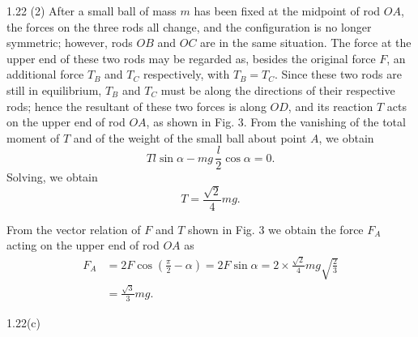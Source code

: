 \begin{solution}{1.22}
(2) After a small ball of mass $m$ has been fixed at the midpoint of rod $OA$, the forces on the three rods all change, and the configuration is no longer symmetric; however, rods $OB$ and $OC$ are in the same situation. The force at the upper end of these two rods may be regarded as, besides the original force $F$, an additional force $T_B$ and $T_C$ respectively, with $T_B=T_C$. Since these two rods are still in equilibrium, $T_B$ and $T_C$ must be along the directions of their respective rods; hence the resultant of these two forces is along $OD$, and its reaction $T$ acts on the upper end of rod $OA$, as shown in Fig. 3. From the vanishing of the total moment of $T$ and of the weight of the small ball about point $A$, we obtain
\[
Tl\sin\alpha-mg\,\frac{l}{2}\cos\alpha=0.
\]
Solving, we obtain
\[
T=\frac{\sqrt{2}}{4}mg.
\]

From the vector relation of $F$ and $T$ shown in Fig. 3 we obtain the force $F_A$ acting on the upper end of rod $OA$ as
\begin{align*}
F_A&=2F\cos\left(\frac{\pi}{2}-\alpha\right)=2F\sin\alpha
=2\times\frac{\sqrt{2}}{4}mg\sqrt{\frac{2}{3}}\\
&=\frac{\sqrt{3}}{3}mg.
\end{align*}

\begin{figbox}{1.22(c)}
\end{figbox}


\end{solution}

